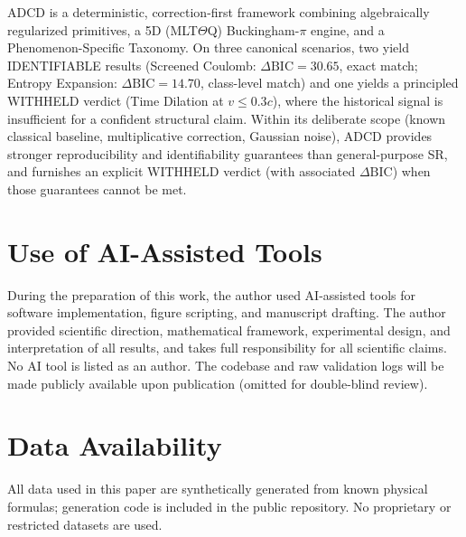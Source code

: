 \documentclass{article}
\begin{document}
ADCD is a deterministic, correction-first framework combining algebraically
regularized primitives, a 5D (MLT$\Theta$Q) Buckingham-$\pi$ engine, and
a Phenomenon-Specific Taxonomy.
On three canonical scenarios, two yield IDENTIFIABLE results
(Screened Coulomb: $\Delta\mathrm{BIC}=30.65$, exact match;
Entropy Expansion: $\Delta\mathrm{BIC}=14.70$, class-level match)
and one yields a principled WITHHELD verdict (Time Dilation at $v\le0.3c$),
where the historical signal is insufficient for a confident structural claim.
Within its deliberate scope (known classical baseline, multiplicative
correction, Gaussian noise), ADCD provides stronger reproducibility and
identifiability guarantees than general-purpose SR, and furnishes an explicit
WITHHELD verdict (with associated $\Delta\mathrm{BIC}$) when those
guarantees cannot be met.

\section*{Use of AI-Assisted Tools}

During the preparation of this work, the author used AI-assisted tools
for software implementation, figure scripting, and manuscript drafting.
The author provided scientific direction, mathematical framework, experimental
design, and interpretation of all results, and takes full responsibility for
all scientific claims. No AI tool is listed as an author.
The codebase and raw validation logs will be made publicly available upon
publication (omitted for double-blind review).

\section*{Data Availability}

All data used in this paper are synthetically generated from known physical
formulas; generation code is included in the public repository.
No proprietary or restricted datasets are used.



\end{document}
